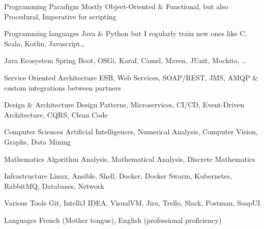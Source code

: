 

\begin{cvskills}

  \cvskill
    {Programming Paradigm}
    {Mostly Object-Oriented \& Functional, but also Procedural, Imperative for scripting}

  \cvskill
    {Programming languages} %
    {Java \& Python but I regularly train new ones like C, Scala, Kotlin, Javascript\dots} %

  \cvskill
    {Java Ecosystem}
	{Spring Boot, OSGi, Karaf, Camel, Maven, JUnit, Mockito, \dots}
    
    
  \cvskill
    {Service Oriented Architecture}
    {ESB, Web Services, SOAP/REST, JMS, AMQP \& custom integrations between partners}

  \cvskill
    {Design \& Architecture}
    {Design Patterns, Microservices, CI/CD, Event-Driven Architecture, CQRS, Clean Code}
    
  \cvskill
    {Computer Sciences}
    {Artificial Intelligences, Numerical Analysis, Computer Vision, Graphs, Data Mining}
    
  \cvskill
    {Mathematics}
    {Algorithm Analysis, Mathematical Analysis, Discrete Mathematics}
      
  \cvskill
    {Infrastructure}
    {Linux, Ansible, Shell, Docker, Docker Swarm, Kubernetes, RabbitMQ, Databases, Network}
        
  \cvskill
    {Various Tools}
    {Git, IntelliJ IDEA, VisualVM, Jira, Trello, Slack, Postman, SoapUI}
    

  \cvskill
    {Languages} %
    {French (Mother tongue), English (professional proficiency)} %

\end{cvskills}
